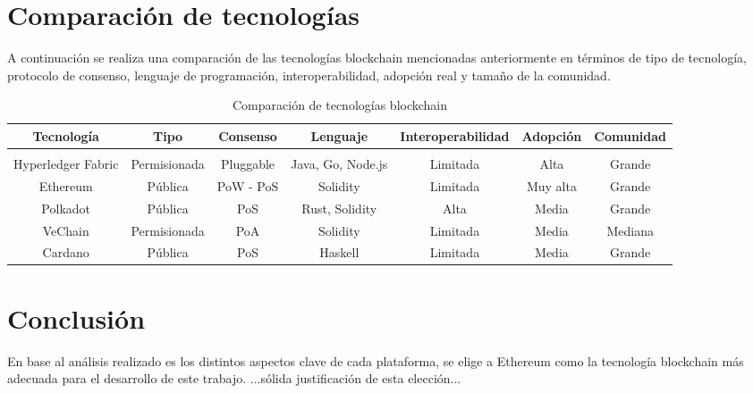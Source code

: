 \documentclass{article}
\begin{document}
\section{Comparación de tecnologías}

A continuación se realiza una comparación de las tecnologías blockchain mencionadas anteriormente en términos de tipo de tecnología, protocolo de consenso, lenguaje de programación, interoperabilidad, adopción real y tamaño de la comunidad.

\begin{table}[h!]
\centering
\begin{tabular}{|c|c|c|c|c|c|c|}
\hline
\textbf{Tecnología} & \textbf{Tipo} & \textbf{Consenso} & \textbf{Lenguaje} & \textbf{Interoperabilidad} & \textbf{Adopción} & \textbf{Comunidad} \\ \hline
\\ \hline
Hyperledger Fabric & Permisionada & Pluggable & Java, Go, Node.js & Limitada & Alta & Grande \\ \hline
Ethereum & Pública & PoW - PoS & Solidity & Limitada & Muy alta & Grande \\ \hline
Polkadot & Pública & PoS & Rust, Solidity & Alta & Media & Grande \\ \hline
VeChain & Permisionada & PoA & Solidity & Limitada & Media & Mediana \\ \hline
Cardano & Pública & PoS & Haskell & Limitada & Media & Grande \\ \hline
\end{tabular}
\caption{Comparación de tecnologías blockchain}
\end{table}


\section{Conclusión}

En base al análisis realizado es los distintos aspectos clave de cada plataforma, se elige a Ethereum como la tecnología blockchain más adecuada para el desarrollo de este trabajo. ...sólida justificación de esta elección...
\end{document}
